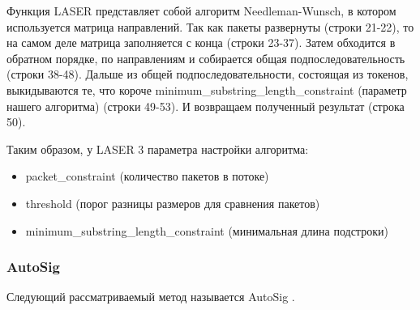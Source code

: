 Функция LASER представляет собой алгоритм Needleman-Wunsch, в котором используется матрица направлений.
Так как пакеты развернуты (строки 21-22), то на самом деле матрица заполняется с конца (строки 23-37).
Затем обходится в обратном порядке, по направлениям и собирается общая подпоследовательность (строки 38-48).
Дальше из общей подпоследовательности, состоящая из токенов, выкидываются те, что короче minimum\_substring\_length\_constraint (параметр нашего алгоритма) (строки 49-53).
И возвращаем полученный результат (строка 50).

Таким образом, у LASER 3 параметра настройки алгоритма:
\begin{itemize}
    \item packet\_constraint (количество пакетов в потоке)
    \item threshold (порог разницы размеров для сравнения пакетов)
    \item minimum\_substring\_length\_constraint (минимальная длина подстроки)
\end{itemize}

\subsubsection{AutoSig}

Следующий рассматриваемый метод называется AutoSig \cite{santosautomatic,ye2009autosig}.

\newpage
